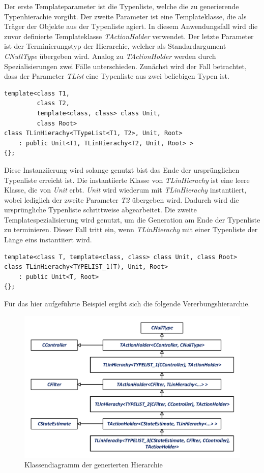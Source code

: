 Der erste Templateparameter ist die Typenliste, welche die zu generierende Typenhierachie vorgibt. Der zweite Parameter ist eine Templateklasse, die als Träger der Objekte aus der Typenliste agiert. In diesem Anwendungsfall wird die zuvor definierte Templateklasse \textit{TActionHolder} verwendet. Der letzte Parameter ist der Terminierungstyp der Hierarchie, welcher als Standardargument \textit{CNullType} übergeben wird. Analog zu \textit{TActionHolder} werden durch Spezialisierungen zwei Fälle unterschieden. Zunächst wird der Fall betrachtet, dass der Parameter \textit{TList} eine Typenliste aus zwei beliebigen Typen ist.
\begin{lstlisting}[caption={Erste Templatespezialisierung der linearen Hierarchie {\cite[S. 64]{ModernCpp}} },captionpos=b]
template<class T1, 
         class T2, 
         template<class, class> class Unit, 
         class Root>
class TLinHierachy<TTypeList<T1, T2>, Unit, Root>
	: public Unit<T1, TLinHierachy<T2, Unit, Root> >
{};
\end{lstlisting}
Diese Instanziierung wird solange genutzt bist das Ende der ursprünglichen Typenliste erreicht ist. Die instantiierte Klasse von \textit{TLinHierachy} ist eine leere Klasse, die von \textit{Unit} erbt. \textit{Unit} wird wiederum mit \textit{TLinHierachy} instantiiert, wobei lediglich der zweite Parameter \textit{T2} übergeben wird. Dadurch wird die ursprüngliche Typenliste schrittweise abgearbeitet.
Die zweite Templatespezialisierung wird genutzt, um die Generation am Ende der Typenliste zu terminieren. Dieser Fall tritt ein, wenn \textit{TLinHierachy} mit einer Typenliste der Länge eins instantiiert wird.
\begin{lstlisting}[caption={Zweite Templatespezialisierung der linearen Hierarchie {\cite[S. 64]{ModernCpp}} },captionpos=b]
template<class T, template<class, class> class Unit, class Root>
class TLinHierachy<TYPELIST_1(T), Unit, Root>
	: public Unit<T, Root>
{};
\end{lstlisting}
Für das hier aufgeführte Beispiel ergibt sich die folgende Vererbungshierarchie.
\begin{figure}[!h]
\centering
\includegraphics[width=0.7\linewidth]{img/SW_1_Signalfluss_KD.pdf}
\caption{Klassendiagramm der generierten Hierarchie}
\end{figure}
